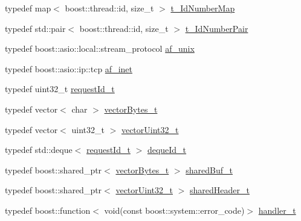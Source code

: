 \begin{DoxyCompactItemize}
typedef map$<$ boost\+::thread\+::id, size\+\_\+t $>$ \hyperlink{namespacextd_1_1network_1_1utils_a778bf7884b2296561ffc1fc5a5f14e38}{t\+\_\+\+Id\+Number\+Map}
\item 
typedef std\+::pair$<$ boost\+::thread\+::id, size\+\_\+t $>$ \hyperlink{namespacextd_1_1network_1_1utils_aa6bd02256b6023347de116a773dd9500}{t\+\_\+\+Id\+Number\+Pair}
\item 
typedef boost\+::asio\+::local\+::stream\+\_\+protocol \hyperlink{namespacextd_1_1network_1_1utils_a60e83921a2d026f07b49fa094988acdf}{af\+\_\+unix}
\item 
typedef boost\+::asio\+::ip\+::tcp \hyperlink{namespacextd_1_1network_1_1utils_a6238bab7a616eda8c9424721444a18d1}{af\+\_\+inet}
\item 
typedef uint32\+\_\+t \hyperlink{namespacextd_1_1network_1_1utils_a0bdb4094852a77df867e219999175200}{request\+Id\+\_\+t}
\item 
typedef vector$<$ char $>$ \hyperlink{namespacextd_1_1network_1_1utils_a9fedf0d18549b8034e9ae347955e9a9a}{vector\+Bytes\+\_\+t}
\item 
typedef vector$<$ uint32\+\_\+t $>$ \hyperlink{namespacextd_1_1network_1_1utils_a2b135df55039cd8024b40ef3e1817681}{vector\+Uint32\+\_\+t}
\item 
typedef std\+::deque$<$ \hyperlink{namespacextd_1_1network_1_1utils_a0bdb4094852a77df867e219999175200}{request\+Id\+\_\+t} $>$ \hyperlink{namespacextd_1_1network_1_1utils_ac3ca189267ad1167fa141608f8b3a2de}{deque\+Id\+\_\+t}
\item 
typedef boost\+::shared\+\_\+ptr$<$ \hyperlink{namespacextd_1_1network_1_1utils_a9fedf0d18549b8034e9ae347955e9a9a}{vector\+Bytes\+\_\+t} $>$ \hyperlink{namespacextd_1_1network_1_1utils_a92b366b7e2a1ab09ac4f4a0401f8fb84}{shared\+Buf\+\_\+t}
\item 
typedef boost\+::shared\+\_\+ptr$<$ \hyperlink{namespacextd_1_1network_1_1utils_a2b135df55039cd8024b40ef3e1817681}{vector\+Uint32\+\_\+t} $>$ \hyperlink{namespacextd_1_1network_1_1utils_af5b287652a0fd8fca54642f8d3ca07fa}{shared\+Header\+\_\+t}
\item 
typedef boost\+::function$<$ void(const boost\+::system\+::error\+\_\+code)$>$ \hyperlink{namespacextd_1_1network_1_1utils_ac8a6f796cd645f83cde023d163665bb5}{handler\+\_\+t}
\end{DoxyCompactItemize}

